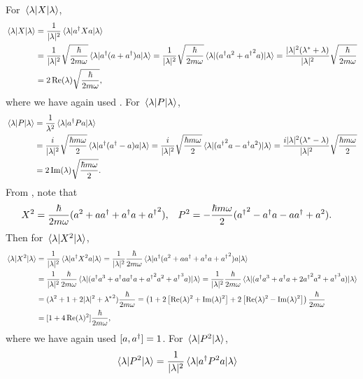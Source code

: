 \begin{solution}
	For $\ev{X}{\lam}$,
	\begin{align}
		\ev{X}{\lam} &= \frac{1}{|\lam|^2} \ev{\ad X a}{\lam} \notag \\
		&= \frac{1}{|\lam|^2} \sqrt{\frac{\hbar}{2 m \omega}} \ev{\ad (a + \ad) a}{\lam}
		= \frac{1}{|\lam|^2} \sqrt{\frac{\hbar}{2 m \omega}} \ev{(\ad a^2 + {\ad}^2 a)}{\lam}
		= \frac{|\lam|^2 (\lam^* + \lam)}{|\lam|^2} \sqrt{\frac{\hbar}{2 m \omega}} \notag \\
		&= 2 \Rel \sqrt{\frac{\hbar}{2 m \omega}}, \label{evX}
	\end{align}
	where we have again used .  For $\ev{P}{\lam}$,
	\begin{align}
		\ev{P}{\lam} &= \frac{1}{\lambda^2} \ev{\ad P a}{\lam} \notag \\
		&= \frac{i}{|\lam|^2} \sqrt{\frac{\hbar m \omega}{2}} \ev{\ad(\ad - a)a}{\lam} = \frac{i}{|\lam|^2} \sqrt{\frac{\hbar m \omega}{2}} \ev{({\ad}^2 a - \ad a^2)}{\lam}
		= \frac{i |\lam|^2 (\lam^* - \lam)}{|\lam|^2} \sqrt{\frac{\hbar m \omega}{2}} \notag \\
		&= 2 \Iml \sqrt{\frac{\hbar m \omega}{2}}. \label{evP}
	\end{align}
	From , note that
	\begin{align*}
		X^2 &= \frac{\hbar}{2 m \omega} (a^2 + a a^\dagger + a^\dagger a + {a^\dagger}^2), &
		P^2 &= -\frac{\hbar m \omega}{2} ({a^\dagger}^2 - a^\dagger a - a a^\dagger + a^2).
	\end{align*}
	Then for $\ev{X^2}{\lam}$,
	\begin{align}
		\ev{X^2}{\lam} &= \frac{1}{|\lam|^2} \ev{\ad X^2 a}{\lam}
		= \frac{1}{|\lam|^2} \frac{\hbar}{2 m \omega} \ev{\ad (a^2 + a \ad + \ad a + {\ad}^2) a}{\lam} \notag \\
		&= \frac{1}{|\lam|^2} \frac{\hbar}{2 m \omega} \ev{(\ad a^3 + \ad a \ad a + {\ad}^2 a^2 + {\ad}^3 a)}{\lam}
		= \frac{1}{|\lam|^2} \frac{\hbar}{2 m \omega} \ev{(\ad a^3 + \ad a + 2 {\ad}^2 a^2 + {\ad}^3 a)}{\lam} \notag \\
		&= (\lam^2 + 1 + 2 |\lam|^2 + {\lam^*}^2) \frac{\hbar}{2 m \omega}
		= \left( 1 + 2 \left[ \Rel^2 + \Iml^2 \right] + 2 \left[ \Rel^2 - \Iml^2 \right] \right) \frac{\hbar}{2 m \omega} \notag \\
		&= [1 + 4 \Rel^2 ] \frac{\hbar}{2 m \omega} \label{evXsq},
	\end{align}
	where we have again used $[a, a^\dagger] = 1$.  For $\ev{P^2}{\lam}$,
	\begin{align}
		\ev{P^2}{\lam} &= \frac{1}{|\lam|^2} \ev{\ad P^2 a}{\lam}

\end{align}
\end{solution}
